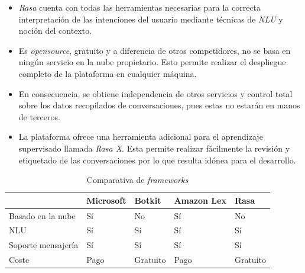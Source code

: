 \begin{itemize}
	\item \textit{Rasa} cuenta con todas las herramientas necesarias para la correcta interpretación de las intenciones del usuario mediante técnicas de \textit{NLU} y noción del contexto.
	\item Es \textit{opensource}, gratuito y a diferencia de otros competidores, no se basa en ningún servicio en la nube propietario. Esto permite realizar el despliegue completo de la plataforma en cualquier máquina. 
	\item  En consecuencia, se obtiene independencia de otros servicios y control total sobre los datos recopilados de conversaciones, pues estas no estarán en manos de terceros.
	\item La plataforma ofrece una herramienta adicional para el aprendizaje supervisado llamada \textit{Rasa X}. Esta permite realizar fácilmente la revisión y etiquetado de las conversaciones por lo que resulta idónea para el desarrollo.
\end{itemize}	

\begin{table}[htbp]
\centering
\begin{tabular}{|l|l|l|l|l|} 
\hline
                   & Microsoft & Botkit   & Amazon Lex & Rasa      \\ 
\hline
Basado en la nube  & Sí        & No       & Sí         & No        \\ 
\hline
NLU                & Sí        & Sí       & Sí         & Sí        \\ 
\hline
Soporte mensajería & Sí        & Sí       & Sí         & Sí        \\ 
\hline
Coste              & Pago      & Gratuito & Pago       & Gratuito  \\
\hline
\end{tabular}
\caption{Comparativa de \textit{frameworks}}
\label{compFrameworks}
\end{table}
